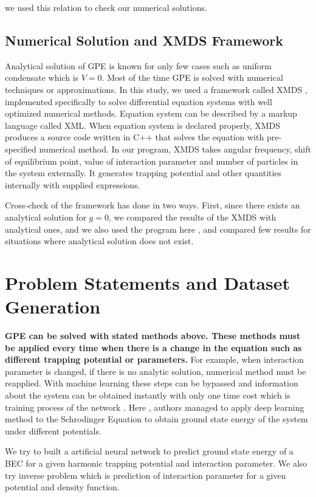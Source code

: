 \documentclass[a4paper,times,12pt]{article}
\begin{document}
we used this relation to check our numerical solutions. 


\subsection{Numerical Solution and XMDS Framework}

Analytical solution of GPE is known for only few cases such as uniform condensate which is $V = 0$. Most of the time GPE is solved with numerical techniques or approximations. In this study, we used a framework called XMDS \cite{dennis2013xmds2}, implemented specifically to solve differential equation systems with well optimized numerical methods. Equation system can be described by a markup language called XML.  When equation system is declared properly, XMDS produces a source code written in C++ that solves the equation with pre-specified numerical method. In our program, XMDS takes angular frequency, shift of equilibrium point, value of interaction parameter and number of particles in the system externally. It generates trapping potential and other quantities internally with supplied expressions.

Cross-check of the framework has done in two ways. First, since there exists an analytical solution for $g = 0$, we compared the results of the XMDS with analytical ones, and we also used the program here \cite{muruganandam2009fortran}, and compared few results for situations where analytical solution does not exist.  


\section{Problem Statements and Dataset Generation}

\textbf{GPE can be solved with stated methods above. These methods must be applied every time when there is a change in the equation such as different trapping potential or parameters.} For example, when interaction parameter is changed, if there is no analytic solution, numerical method must be reapplied. With machine learning these steps can be bypassed and information about the system can be obtained instantly with only one time cost which is training process of the network \cite{mills2017deep}. Here \cite{mills2017deep}, authors managed to apply deep learning method to the Schrodinger Equation to obtain ground state energy of the system under different potentials. 

We try to built a artificial neural network to predict ground state energy of a BEC for a given harmonic trapping potential and interaction parameter. We also try inverse problem which is prediction of interaction parameter for a given potential and density function. 
\end{document}
